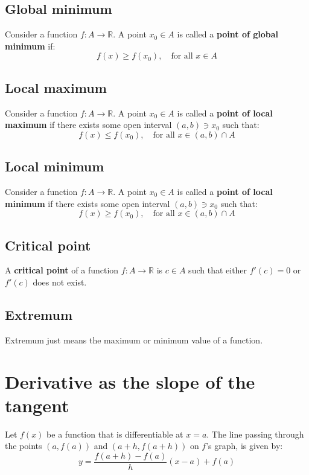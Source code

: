 \documentclass[11pt]{article}
\begin{document}
\subsection{Global minimum}
\label{sec:org0229bf0}
Consider a function \(f : A \rightarrow \mathbb{R}\). A point \(x_0 \in A\) is called a \textbf{point of global minimum} if:
\[f(x) \ge f(x_0), \quad \text{for all } x \in A\]

\subsection{Local maximum}
\label{sec:orgcdcaae9}
Consider a function \(f : A \rightarrow \mathbb{R}\). A point \(x_0 \in A\) is called a \textbf{point of local maximum} if there exists some open interval \((a, b) \ni x_0\) such that:
\[f(x) \le f(x_0), \quad \text{for all } x \in (a, b) \cap A\]

\subsection{Local minimum}
\label{sec:orgb73594a}
Consider a function \(f : A \rightarrow \mathbb{R}\). A point \(x_0 \in A\) is called a \textbf{point of local minimum} if there exists some open interval \((a, b) \ni x_0\) such that:
\[f(x) \ge f(x_0), \quad \text{for all } x \in (a, b) \cap A\]

\subsection{Critical point}
\label{sec:orge6d95ee}
A \textbf{critical point} of a function \(f : A \rightarrow \mathbb{R}\) is \(c \in A\) such that either \(f'(c) = 0\) or \(f'(c)\) does not exist.

\subsection{Extremum}
\label{sec:org9b4b52c}
Extremum just means the maximum or minimum value of a function.

\newpage

\section{Derivative as the slope of the tangent}
\label{sec:orgbc5d87f}
Let \(f(x)\) be a function that is differentiable at \(x = a\). The line passing through the points \((a, f(a))\) and \((a + h, f(a + h))\) on \(f\)'s graph, is given by:
\[y = \frac{f(a + h) - f(a)}{h} (x - a) + f(a)\]
\end{document}
